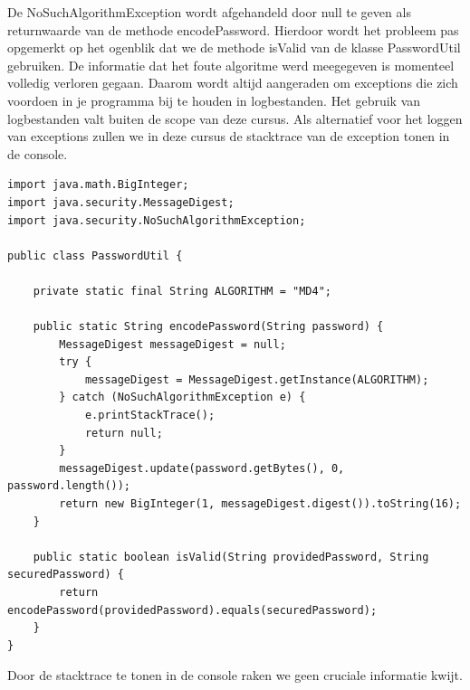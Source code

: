 De NoSuchAlgorithmException wordt afgehandeld door null te geven als returnwaarde van de methode encodePassword.  Hierdoor wordt het probleem pas opgemerkt op het ogenblik dat we de methode isValid van de klasse PasswordUtil gebruiken. De informatie dat het foute algoritme werd meegegeven is momenteel volledig verloren gegaan. Daarom wordt altijd aangeraden om exceptions die zich voordoen in je programma bij te houden in logbestanden. Het gebruik van logbestanden valt buiten de scope van deze cursus. Als alternatief voor het loggen van exceptions zullen we in deze cursus de stacktrace van de exception tonen in de console.

\begin{lstlisting}
import java.math.BigInteger;
import java.security.MessageDigest;
import java.security.NoSuchAlgorithmException;

public class PasswordUtil {

	private static final String ALGORITHM = "MD4";

	public static String encodePassword(String password) {
		MessageDigest messageDigest = null;
		try {
			messageDigest = MessageDigest.getInstance(ALGORITHM);
		} catch (NoSuchAlgorithmException e) {
			e.printStackTrace();
			return null;
		}
		messageDigest.update(password.getBytes(), 0, password.length());
		return new BigInteger(1, messageDigest.digest()).toString(16);
	}

	public static boolean isValid(String providedPassword, String securedPassword) {
		return encodePassword(providedPassword).equals(securedPassword);
	}
}
\end{lstlisting}
 
Door de stacktrace te tonen in de console raken we geen cruciale informatie kwijt.

